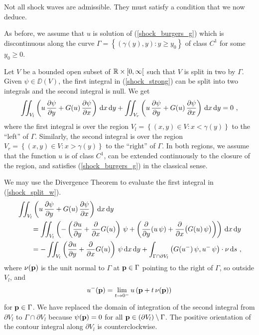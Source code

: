 Not all shock waves are admissible.  They must satisfy a condition that
we now deduce.

As before, we assume that $u$ is solution of (\ref{shock_burgers_g})
which is discontinuous along the curve
$\displaystyle \Gamma = \left\{ (\gamma(y),y) : y \geq y_0 \right\}$ of
class $\displaystyle C^1$ for some $y_0 \geq 0$.

Let $V$ be a bounded open subset of $\RR \times [0,\infty[$ such that
$V$ is split in two by $\Gamma$.  Given $\psi \in \DD(V)$, the first
integral in (\ref{shock_strong}) can be split into two integrals and
the second integral is null.  We get
\begin{equation} \label{shock_split_w}
\iint_{V_l}
\left(u\,\pdydx{\psi}{y} + G(u)\,\pdydx{\psi}{x} \right) \dx{x}\dx{y} \\
+ \iint_{V_r}
\left(u\,\pdydx{\psi}{y} + G(u)\,\pdydx{\psi}{x} \right) \dx{x}\dx{y} = 0 \ ,
\end{equation}
where the first integral is over the region
$V_l = \left\{ (x,y) \in V : x < \gamma(y)  \right\}$
to the ``left'' of $\Gamma$.  Similarly, the second integral
is over the region $V_r = \left\{ (x,y) \in V : x > \gamma(y) \right\}$
to the ``right'' of $\Gamma$.  In both regions, we
assume that the function $u$ is of class $\displaystyle C^1$, can be
extended continuously to the closure of the region, and
satisfies (\ref{shock_burgers_g}) in the classical sense.

We may use the Divergence Theorem to evaluate the first integral in
(\ref{shock_split_w}).
\begin{align}
& \iint_{V_l}
\left(u\,\pdydx{\psi}{y} + G(u)\,\pdydx{\psi}{x} \right) \dx{x}\dx{y}
\nonumber \\
&\qquad = \iint_{V_l} \left(
-\left( \pdydx{u}{y}+ \pdfdx{G(u)}{x}\right)\,\psi
+ \left( \pdfdx{\left(u\,\psi\right)}{y} +
\pdfdx{\big(G(u)\,\psi\big)}{x} \right) \right) \dx{x}\dx{y}
\nonumber \\
&\qquad = -\iint_{V_l}
\left( \pdydx{u}{y} + \pdfdx{G(u)}{x} \right)\,\psi
\dx{x}\dx{y}
+ \int_{\Gamma \cap \partial V_l} \left(G(u^-)\,\psi, u^-\,\psi \right)\cdot
\VEC{\nu} \dx{s} \ , \label{shock_burgers_W1}
\end{align}
where $\displaystyle \VEC{\nu}(\VEC{p})$ is the unit normal to $\Gamma$
at $\VEC{p} \in \Gamma$ pointing to the right of $\Gamma$, so outside
$V_l$, and
\[
u^-(\VEC{p}) = \lim_{t\rightarrow 0^-}
u\left(\VEC{p}+t\, \VEC{\nu}(\VEC{p})\right)
\]
for $\VEC{p} \in \Gamma$.
We have replaced the domain of integration of the second integral from
$\partial V_l$ to $\Gamma \cap \partial V_l$ because
$\psi(\VEC{p}) = 0$ for all $\VEC{p} \in (\partial V_l) \setminus \Gamma$.
The positive orientation of the contour integral along $\partial V_l$ is
counterclockwise.

